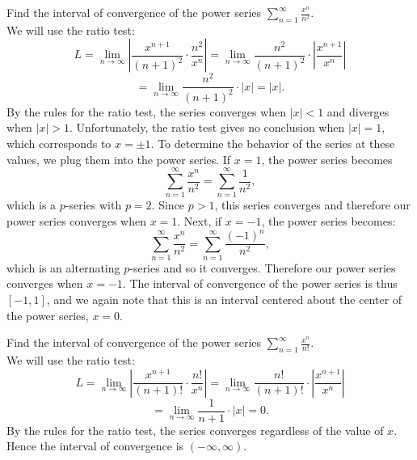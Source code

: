 \documentclass{ximera}
\begin{document}
\begin{example}[example 2]
Find the interval of convergence of the power series $\displaystyle{\sum_{n=1}^\infty \frac{x^n}{n^2}}$.\\
We will use the ratio test:
\[
L = \lim_{n \to \infty} \left|\frac{x^{n+1}}{(n+1)^2} \cdot \frac{n^2}{x^n} \right| = \lim_{n \to \infty} \frac{n^2}{(n+1)^2}\cdot \left|  \frac{x^{n+1}}{x^n} \right| 
\]
\[
= \lim_{n \to \infty} \frac{n^2}{(n+1)^2}\cdot \left|  x \right| = |x|.
\]
By the rules for the ratio test, the series converges when $|x| < 1$ and diverges when $|x| > 1$.
Unfortunately, the ratio test gives no conclusion when $|x| = 1$, which corresponds to $x = \pm 1$.
To determine the behavior of the series at these values, we plug them into the power series.
If $x = 1$, the power series becomes
\[
\sum_{n=1}^\infty \frac{x^n}{n^2} = \sum_{n=1}^\infty \frac{1}{n^2},
\]
which is a $p$-series with $p = 2$. Since $p >1$, this series converges and therefore our power series converges when $x = 1$.
Next, if $x = -1$, the power series becomes:
\[
\sum_{n=1}^\infty \frac{x^n}{n^2} = \sum_{n=1}^\infty \frac{(-1)^n}{n^2},
\]
which is an alternating $p$-series and so it converges. Therefore our power series converges when $x = -1$.
The interval of convergence of the power series is thus $[-1, 1]$, and we again note that this is an interval centered about the 
center of the power series, $x = 0$.
\end{example}

\begin{example}[example 3]
Find the interval of convergence of the power series $\displaystyle{\sum_{n=1}^\infty \frac{x^n}{n!}}$.\\
We will use the ratio test:
\[
L = \lim_{n \to \infty} \left|\frac{x^{n+1}}{(n+1)!} \cdot \frac{n!}{x^n} \right| = \lim_{n \to \infty} \frac{n!}{(n+1)!}\cdot \left|  \frac{x^{n+1}}{x^n} \right| 
\]
\[
= \lim_{n \to \infty} \frac{1}{n+1}\cdot |x| = 0.
\]
By the rules for the ratio test, the series converges regardless of the value of $x$.
Hence the interval of convergence is $(-\infty, \infty)$.
\end{example}
\end{document}
